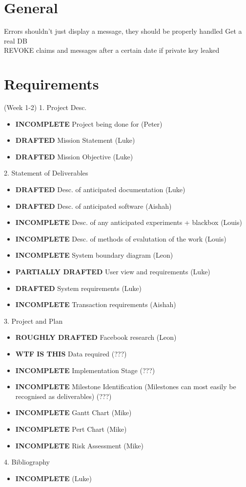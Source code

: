 \section{General}
Errors shouldn't just display a message, they should be properly handled
Get a real DB\\
REVOKE claims and messages after a certain date if private key leaked\\

\section{Requirements} (Week 1-2)
1. Project Desc.
\begin{itemize}
\item \textbf{INCOMPLETE} Project being done for (Peter)
\item \textbf{DRAFTED} Mission Statement (Luke)
\item \textbf{DRAFTED} Mission Objective (Luke)
\end{itemize}

2. Statement of Deliverables
\begin{itemize}
\item \textbf{DRAFTED} Desc. of anticipated documentation (Luke)
\item \textbf{DRAFTED} Desc. of anticipated software (Aishah)
\item \textbf{INCOMPLETE} Desc. of any anticipated experiments + blackbox (Louis)
\item \textbf{INCOMPLETE} Desc. of methods of evalutation of the work (Louis)
\item \textbf{INCOMPLETE} System boundary diagram (Leon)
\item \textbf{PARTIALLY DRAFTED} User view and requirements (Luke)
\item \textbf{DRAFTED} System requirements (Luke)
\item \textbf{INCOMPLETE} Transaction requirements (Aishah)
\end{itemize}

3. Project and Plan
\begin{itemize}
\item \textbf{ROUGHLY DRAFTED} Facebook research (Leon)
\item \textbf{WTF IS THIS} Data required (???)
\item \textbf{INCOMPLETE} Implementation Stage (???)
\item \textbf{INCOMPLETE} Milestone Identification (Milestones can most easily be recognised as deliverables) (???)
\item \textbf{INCOMPLETE} Gantt Chart (Mike)
\item \textbf{INCOMPLETE} Pert Chart (Mike)
\item \textbf{INCOMPLETE} Risk Assessment (Mike)
\end{itemize}

4. Bibliography
\begin{itemize}
\item \textbf{INCOMPLETE} (Luke)
\end{itemize}
